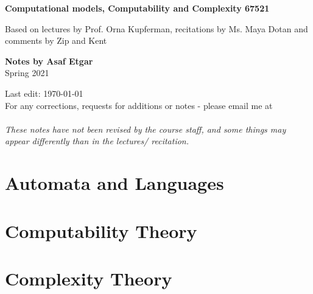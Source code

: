 \documentclass[a4paper, 11pt, oneside]{book}
\begin{document}

\begin{titlepage}
    \begin{center}
        \vspace*{1cm}

        \LARGE
        \textbf{Computational models, Computability and Complexity 67521}

        \vspace{0.5cm}
        \Large
        Based on lectures by Prof. Orna Kupferman, recitations by Ms. Maya Dotan and comments by Zip and Kent 

        \vspace{1.5cm}
        \large
        \textbf{Notes by Asaf Etgar}\\
        Spring 2021\\
        




        \vspace{0.8cm}

        \large
        Last edit:
        \today \\
        For any corrections, requests for additions or notes - please email me at \\
        \\
        		\vspace{0.8cm}
        \textit{These notes have not been revised by the course staff, and some things may appear differently than in the lectures/ recitation.}

    \end{center}
\end{titlepage}
\tableofcontents
\part{Automata and Languages}


\part{Computability Theory}

\part{Complexity Theory} 

\end{document}
